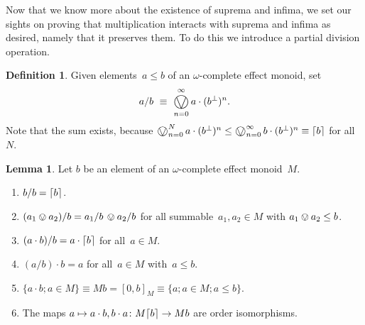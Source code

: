 \documentclass[10pt,conference]{IEEEtran}
\DeclarePairedDelimiter{\ceil}{\lceil}{\rceil}
\newcounter{counter}
\theoremstyle{definition}
\newtheorem{lemma}[counter]{Lemma}
\newtheorem{definition}[counter]{Definition}
\newcommand{\bigovee}{\mathop{\vphantom{\sum}\mathchoice%
        {\vcenter{\hbox{\huge $\ovee$}}}%
        {\vcenter{\hbox{\Large $\ovee$}}}%
        {\ovee}{\ovee}}\displaylimits}
\begin{document}
Now that we know more about the existence of suprema and infima, we set our sights on proving that multiplication interacts with suprema and infima as desired, namely that it preserves them. To do this we introduce a partial division operation.
\begin{definition}
Given elements~$a\leq b$ of an $\omega$-complete
effect monoid, set
\begin{equation*}
    a/b \ \equiv \ \bigovee_{n=0}^\infty a \cdot (b^\perp)^n.
\end{equation*}
    Note that the sum exists,
    because $\bigovee_{n=0}^N
    a\cdot (b^\perp)^n 
    \leq {\bigovee_{n=0}^\infty b \cdot (b^\perp)^n}
    \equiv\ceil{b}$ for all~$N$.
\end{definition}
\begin{lemma}
\label{lem:div}
Let $b$ be an element of an $\omega$-complete
effect monoid~$M$.
\begin{enumerate}
\item
\label{lem:div-adiva}
$b/b = \ceil{b}$.
\item
\label{lem:div-additive}
$(a_1\ovee a_2)/ b = a_1/b\,\ovee a_2/b$
for all summable~$a_1,a_2\in M$ with $a_1\ovee a_2\leq b$.
\item
\label{lem:div-abdivb}
$(a\cdot b)/b = a\cdot \ceil{b}$
for all~$a\in M$.
\item
\label{lem:div-adivbb}
$(a/b)\cdot b = a$
for all~$a\in M$ with~$a\leq b$.
\item
    \label{lem:div-mb}
        $\{ a \cdot b; a \in M \} \equiv  Mb  = [0,b]_M \equiv \{a; a\in M; a \leq b\}$.
\item
    \label{lem:div-iso}
        The maps $a\mapsto a\cdot b,b\cdot a\colon M\ceil{b} \to M b$
are order isomorphisms.
\end{enumerate}
\end{lemma}
\end{document}
